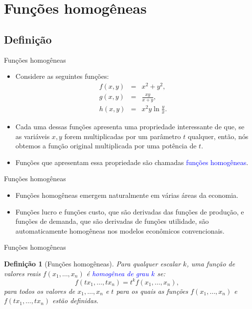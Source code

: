 \documentclass[10pt]{beamer}
\newtheorem{defi}{Definição}
\begin{document}
\section{Funções homogêneas}
\subsection{Definição}
\begin{frame}{Funções homogêneas}
    \begin{itemize}
        \item Considere as seguintes funções:
        \begin{eqnarray*}
            f(x,y) &=& x^2 + y^2, \\
            g(x,y) &=& \frac{xy}{x + y}, \\
            h(x,y) &=& x^2y\ln \frac{y}{x}.
        \end{eqnarray*}
         
        \item Cada uma dessas funções apresenta uma propriedade interessante de que, se as variáveis $x, y$ forem multiplicadas por um parâmetro $t$ qualquer, então, nós obtemos a função original multiplicada por uma potência de $t$.
        \bigskip
        \item Funções que apresentam essa propriedade são chamadas \textcolor{blue}{funções homogêneas}.
    \end{itemize}
\end{frame}

\begin{frame}{Funções homogêneas}
    \begin{itemize}
        \item Funções homogêneas emergem naturalmente em várias áreas da economia.
        \bigskip
        \item Funções lucro e funções custo, que são derivadas das funções de produção, e funções de demanda, que são derivadas de funções utilidade, são automaticamente homogêneas nos modelos econômicos convencionais.
    \end{itemize}
\end{frame}

\begin{frame}{Funções homogêneas}
    \begin{defi}[Funções homogêneas]
        Para qualquer escalar $k$, uma função de valores reais $f(x_1, \dots, x_n)$ é \textcolor{blue}{homogênea de grau $k$} se:
        \begin{equation}
            f(tx_1, \dots, tx_n) = t^k f(x_1, \dots, x_n),
            \label{eq1}
        \end{equation}
        para todos os valores de $x_1, \dots, x_n$ e $t$ para os quais as funções $f(x_1, \dots, x_n)$ e  $f(tx_1, \dots, tx_n)$ estão definidas.
    \end{defi}
\end{frame}
\end{document}
